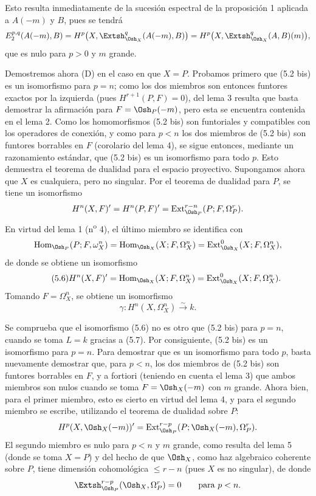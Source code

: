 Esto resulta inmediatamente de la sucesión espectral de la proposición 1 aplicada a
$A(-m)$ y $B$, pues se tendrá
\[
  E_{2}^{p,q}(A(-m),B)
  =H^{p}\bigl(X,\Extsh_{\Osh_X}^{q}(A(-m),B)\bigr)
  =H^{p}\bigl(X,\Extsh_{\Osh_X}^{q}(A,B)(m)\bigr),
\]
que es nulo para $p>0$ y $m$ grande.

Demostremos ahora (D) en el caso en que $X=P$. Probamos primero que (5.2 bis)
es un isomorfismo para $p=n$; como los dos miembros son entonces
funtores exactos por la izquierda (pues $H^{r+1}(P,F)=0$), del lema 3 resulta
que basta demostrar la afirmación para $F=\Osh_P(-m)$, pero esta se encuentra
contenida en el lema 2. Como los homomorfismos (5.2 bis) son funtoriales y
compatibles con los operadores de conexión, y como para $p<n$ los dos miembros de
(5.2 bis) son funtores borrables en $F$ (corolario del lema 4), se
sigue entonces, mediante un razonamiento estándar, que (5.2 bis) es un isomorfismo
para todo $p$. Esto demuestra el teorema de dualidad para el espacio proyectivo.
Supongamos ahora que $X$ es cualquiera, pero no singular. Por el teorema de
dualidad para $P$, se tiene un isomorfismo
\[
  H^{n}(X,F)'=H^{n}(P,F)'
  =\operatorname{Ext}_{\Osh_P}^{r-n}(P;F,\Omega_P^{r}).
\]
En virtud del lema 1 (n\textsuperscript{o} 4), el último miembro se identifica con
\[
  \operatorname{Hom}_{\Osh_P}(P;F,\omega_X^{n})
  =\operatorname{Hom}_{\Osh_X}(X;F,\Omega_X^{n})
  =\operatorname{Ext}_{\Osh_X}^{0}(X;F,\Omega_X^{n}),
\]
de donde se obtiene un isomorfismo
\begin{equation}\tag{5.6}
  H^{n}(X,F)'=\operatorname{Hom}_{\Osh_X}(X;F,\Omega_X^{n})
  =\operatorname{Ext}_{\Osh_X}^{0}(X;F,\Omega_X^{n}).
\end{equation}
Tomando $F=\Omega_X^{n}$, se obtiene un isomorfismo
\begin{equation}\tag{5.7}
  \gamma:H^{n}(X,\Omega_X^{n})\xrightarrow{\sim}k.
\end{equation}

Se comprueba que el isomorfismo (5.6) no es otro que (5.2 bis) para $p=n$, cuando
se toma $L=k$ gracias a (5.7). Por consiguiente, (5.2 bis) es un isomorfismo para
$p=n$. Para demostrar que es un isomorfismo para todo $p$, basta nuevamente
demostrar que, para $p<n$, los dos miembros de (5.2 bis) son funtores
borrables en $F$, y a fortiori (teniendo en cuenta el lema 3) que ambos miembros
son nulos cuando se toma $F=\Osh_X(-m)$ con $m$ grande. Ahora bien, para el primer
miembro, esto es cierto en virtud del lema 4, y para el segundo miembro se escribe,
utilizando el teorema de dualidad sobre $P$:
\[
  H^{p}(X,\Osh_X(-m))'
  =\operatorname{Ext}_{\Osh_P}^{r-p}
    (P;\Osh_X(-m),\Omega_P^{r}).
\]
El segundo miembro es nulo para $p<n$ y $m$ grande, como resulta del lema 5
(donde se toma $X=P$) y del hecho de que $\Osh_X$, como haz algebraico
coherente sobre $P$, tiene dimensión cohomológica $\leq r-n$ (pues $X$ es no
singular), de donde
\[
  \Extsh_{\Osh_P}^{r-p}(\Osh_X,\Omega_P^{r})=0
  \qquad\text{para }p<n.
\]

